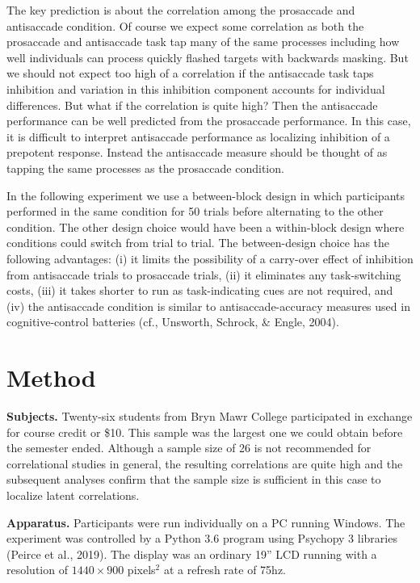 \documentclass[
  ,man,floatsintext]{apa6}
\begin{document}
The key prediction is about the correlation among the prosaccade and antisaccade condition. Of course we expect some correlation as both the prosaccade and antisaccade task tap many of the same processes including how well individuals can process quickly flashed targets with backwards masking. But we should not expect too high of a correlation if the antisaccade task taps inhibition and variation in this inhibition component accounts for individual differences. But what if the correlation is quite high? Then the antisaccade performance can be well predicted from the prosaccade performance. In this case, it is difficult to interpret antisaccade performance as localizing inhibition of a prepotent response. Instead the antisaccade measure should be thought of as tapping the same processes as the prosaccade condition.

In the following experiment we use a between-block design in which participants performed in the same condition for 50 trials before alternating to the other condition. The other design choice would have been a within-block design where conditions could switch from trial to trial. The between-design choice has the following advantages: (i) it limits the possibility of a carry-over effect of inhibition from antisaccade trials to prosaccade trials, (ii) it eliminates any task-switching costs, (iii) it takes shorter to run as task-indicating cues are not required, and (iv) the antisaccade condition is similar to antisaccade-accuracy measures used in cognitive-control batteries (cf., Unsworth, Schrock, \& Engle, 2004).

\hypertarget{method}{%
\section{Method}\label{method}}

\textbf{Subjects.} Twenty-six students from Bryn Mawr College participated in exchange for course credit or \$10. This sample was the largest one we could obtain before the semester ended. Although a sample size of 26 is not recommended for correlational studies in general, the resulting correlations are quite high and the subsequent analyses confirm that the sample size is sufficient in this case to localize latent correlations.

\textbf{Apparatus.} Participants were run individually on a PC running Windows. The experiment was controlled by a Python 3.6 program using Psychopy 3 libraries (Peirce et al., 2019). The display was an ordinary 19'' LCD running with a resolution of \(1440 \times 900\) pixels\(^2\) at a refresh rate of 75hz.
\end{document}
